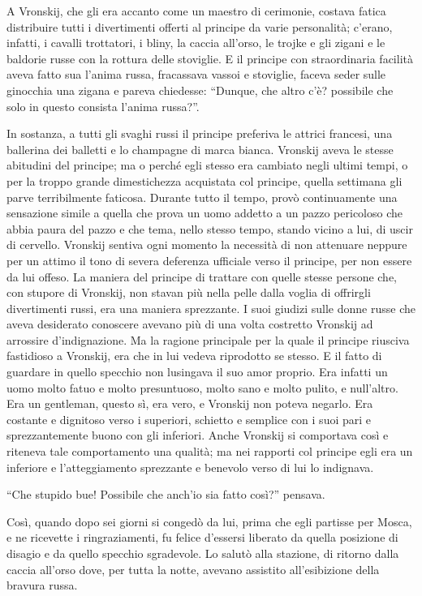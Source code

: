 A Vronskij, che gli era accanto come un maestro di cerimonie, costava fatica distribuire tutti i divertimenti offerti al principe da varie personalità; c'erano, infatti, i cavalli trottatori, i bliny, la caccia all'orso, le trojke e gli zigani e le baldorie russe con la rottura delle stoviglie. E il principe con straordinaria facilità aveva fatto sua l'anima russa, fracassava vassoi e stoviglie, faceva seder sulle ginocchia una zigana e pareva chiedesse: ``Dunque, che altro c'è? possibile che solo in questo consista l'anima russa?''. 

In sostanza, a tutti gli svaghi russi il principe preferiva le attrici francesi, una ballerina dei balletti e lo champagne di marca bianca. Vronskij aveva le stesse abitudini del principe; ma o perché egli stesso era cambiato negli ultimi tempi, o per la troppo grande dimestichezza acquistata col principe, quella settimana gli parve terribilmente faticosa. Durante tutto il tempo, provò continuamente una sensazione simile a quella che prova un uomo addetto a un pazzo pericoloso che abbia paura del pazzo e che tema, nello stesso tempo, stando vicino a lui, di uscir di cervello. Vronskij sentiva ogni momento la necessità di non attenuare neppure per un attimo il tono di severa deferenza ufficiale verso il principe, per non essere da lui offeso. La maniera del principe di trattare con quelle stesse persone che, con stupore di Vronskij, non stavan più nella pelle dalla voglia di offrirgli divertimenti russi, era una maniera sprezzante. I suoi giudizi sulle donne russe che aveva desiderato conoscere avevano più di una volta costretto Vronskij ad arrossire d'indignazione. Ma la ragione principale per la quale il principe riusciva fastidioso a Vronskij, era che in lui vedeva riprodotto se stesso. E il fatto di guardare in quello specchio non lusingava il suo amor proprio. Era infatti un uomo molto fatuo e molto presuntuoso, molto sano e molto pulito, e null'altro. Era un gentleman, questo sì, era vero, e Vronskij non poteva negarlo. Era costante e dignitoso verso i superiori, schietto e semplice con i suoi pari e sprezzantemente buono con gli inferiori. Anche Vronskij si comportava così e riteneva tale comportamento una qualità; ma nei rapporti col principe egli era un inferiore e l'atteggiamento sprezzante e benevolo verso di lui lo indignava. 

``Che stupido bue! Possibile che anch'io sia fatto così?'' pensava. 

Così, quando dopo sei giorni si congedò da lui, prima che egli partisse per Mosca, e ne ricevette i ringraziamenti, fu felice d'essersi liberato da quella posizione di disagio e da quello specchio sgradevole. Lo salutò alla stazione, di ritorno dalla caccia all'orso dove, per tutta la notte, avevano assistito all'esibizione della bravura russa. 

